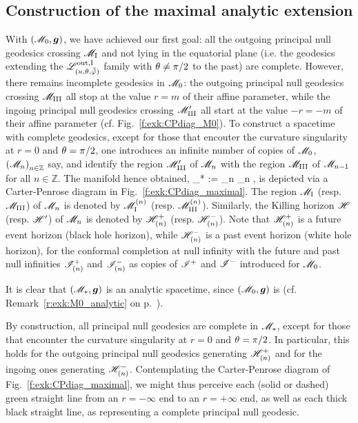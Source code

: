 \subsection{Construction of the maximal analytic extension}

With $(\mathscr{M}_0,\bm{g})$, we have achieved our first goal: all the outgoing
principal null geodesics crossing $\mathscr{M}_{\rm I}$ and not lying in the equatorial
plane (i.e. the geodesics extending the $\mathscr{L}^{\rm out, I}_{(u,\theta,\tilde{{\tilde\varphi}})}$
family with $\theta\neq \pi/2$ to the past) are complete. However, there remains
incomplete geodesics in $\mathscr{M}_0$: the outgoing principal null geodesics crossing $\mathscr{M}_{\rm III}$
all stop at the value $r=m$ of their affine parameter, while
the ingoing principal null geodesics crossing $\mathscr{M}'_{\rm III}$ all start at the
value $-r = -m$ of their affine parameter (cf. Fig.~\ref{f:exk:CPdiag_M0}).
To construct a spacetime with complete geodesics, except for those that encouter the curvature singularity at $r=0$ and $\theta=\pi/2$, one introduces an infinite number of copies of $\mathscr{M}_0$,
$\left( \mathscr{M}_n \right)_{n\in\mathbb{Z}}$ say, and identify the region $\mathscr{M}'_{\rm III}$ of $\mathscr{M}_n$
with the region $\mathscr{M}_{\rm III}$ of $\mathscr{M}_{n-1}$ for all $n\in\mathbb{Z}$.
The manifold hence obtained,
\be
    \M_* := \bigcup_{n\in{}} \M_n ,
\ee
is depicted via a
Carter-Penrose diagram in Fig.~\ref{f:exk:CPdiag_maximal}.
The region $\mathscr{M}_{\rm I}$ (resp. $\mathscr{M}_{\rm III}$) of $\mathscr{M}_n$ is
denoted by $\mathscr{M}_{\rm I}^{(n)}$ (resp. $\mathscr{M}_{\rm III}^{(n)}$). Similarly,
the Killing horizon $\mathscr{H}$ (resp. $\mathscr{H}'$) of $\mathscr{M}_n$ is denoted
by $\mathscr{H}_{(n)}^+$ (resp. $\mathscr{H}_{(n)}^-$). Note that $\mathscr{H}_{(n)}^+$
is a future event horizon (black hole horizon), while
$\mathscr{H}_{(n)}^-$ is a past event horizon (white hole horizon),
for the conformal completion at null infinity with
the future and past null infinities $\mathscr{I}^+_{(n)}$ and $\mathscr{I}^-_{(n)}$
as copies of $\mathscr{I}^+$ and $\mathscr{I}^-$ introduced for $\mathscr{M}_0$.

It is clear that $(\mathscr{M}_*,\bm{g})$ is an analytic spacetime, since $(\mathscr{M}_0,\bm{g})$
is (cf. Remark~\ref{r:exk:M0_analytic} on p.~\pageref{r:exk:M0_analytic}).

By construction, all principal null geodesics are complete in $\mathscr{M}_*$,
except for those that encounter the curvature singularity at
$r=0$ and $\theta=\pi/2$. In particular, this holds for the outgoing
principal null geodesics generating $\mathscr{H}_{(n)}^+$
and for the ingoing ones generating $\mathscr{H}_{(n)}^-$.
Contemplating the Carter-Penrose diagram of Fig.~\ref{f:exk:CPdiag_maximal},
we might thus perceive each (solid or dashed) green straight line
from an $r=-\infty$ end to an $r=+\infty$ end, as well as
each thick black straight line, as representing a complete principal null
geodesic.

